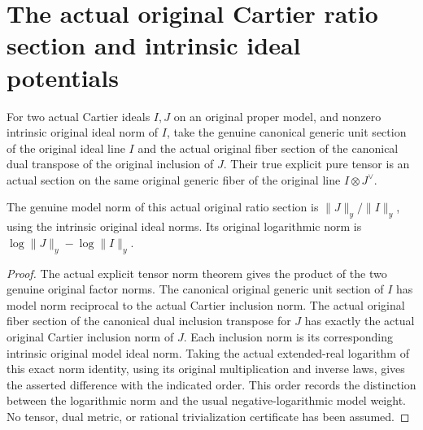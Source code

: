 \section{The actual original Cartier ratio section and intrinsic ideal potentials}

\begin{definition}
\label{def:actual-cartier-ratio-generic-section}
\leanok
{}
For two actual Cartier ideals $I,J$ on an original proper model,
and nonzero intrinsic original ideal norm of $I$, take the genuine
canonical generic unit section of the original ideal line $I$
and the actual original fiber section of the canonical dual
transpose of the original inclusion of $J$. Their true explicit
pure tensor is an actual section on the same original generic
fiber of the original line $I\otimes J^\vee$.
\end{definition}

\begin{theorem}
\label{thm:actual-cartier-ratio-generic-model-norm}
\leanok
{}
The genuine model norm of this actual original ratio section is
$\|J\|_y/\|I\|_y$, using the intrinsic original ideal norms. Its
original logarithmic norm is
$\log\|J\|_y-\log\|I\|_y$.
\end{theorem}
\begin{proof}
The actual explicit tensor norm theorem gives the product of the
two genuine original factor norms. The canonical original generic
unit section of $I$ has model norm reciprocal to the actual
Cartier inclusion norm. The actual original fiber section of the
canonical dual inclusion transpose for $J$ has exactly the actual
original Cartier inclusion norm of $J$. Each inclusion norm is
its corresponding intrinsic original model ideal norm. Taking
the actual extended-real logarithm of this exact norm identity,
using its original multiplication and inverse laws, gives the
asserted difference with the indicated order. This order records
the distinction between the logarithmic norm and the usual
negative-logarithmic model weight. No tensor, dual metric, or
rational trivialization certificate has been assumed.
\end{proof}

